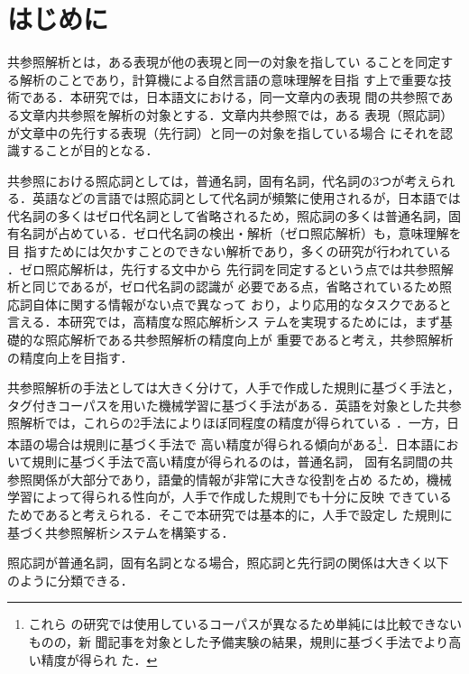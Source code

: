 \documentclass[japanese]{jnlp_1.4}
\begin{document}
\maketitle



 \section{はじめに}
 \label{hajime}
 共参照解析とは，ある表現が他の表現と同一の対象を指してい
 ることを同定する解析のことであり，計算機による自然言語の意味理解を目指
 す上で重要な技術である．本研究では，日本語文における，同一文章内の表現
 間の共参照である文章内共参照を解析の対象とする．文章内共参照では，ある
 表現（照応詞）が文章中の先行する表現（先行詞）と同一の対象を指している場合
 にそれを認識することが目的となる．

 共参照における照応詞としては，普通名詞，固有名詞，代名詞の3つが考えられ
 る．英語などの言語では照応詞として代名詞が頻繁に使用されるが，日本語では
 代名詞の多くはゼロ代名詞として省略されるため，照応詞の多くは普通名詞，固
 有名詞が占めている．ゼロ代名詞の検出・解析（ゼロ照応解析）も，意味理解を目
 指すためには欠かすことのできない解析であり，多くの研究が行われている
 \cite{Seki2002,Kawahara2004a,Iida2006}．ゼロ照応解析は，先行する文中から
 先行詞を同定するという点では共参照解析と同じであるが，ゼロ代名詞の認識が
 必要である点，省略されているため照応詞自体に関する情報がない点で異なって
 おり，より応用的なタスクであると言える．本研究では，高精度な照応解析シス
 テムを実現するためには，まず基礎的な照応解析である共参照解析の精度向上が
 重要であると考え，共参照解析の精度向上を目指す．

 共参照解析の手法としては大きく分けて，人手で作成した規則に基づく手法と，
 タグ付きコーパスを用いた機械学習に基づく手法がある．英語を対象とした共参
 照解析では，これらの2手法によりほぼ同程度の精度が得られている
 \cite{Soon2001,Ng2002a,Zhou2004}．一方，日本語の場合は規則に基づく手法で
 高い精度が得られる傾向がある\cite{Iida2003,Murata1996b}\footnote{これら
 の研究では使用しているコーパスが異なるため単純には比較できないものの，新
 聞記事を対象とした予備実験の結果，規則に基づく手法でより高い精度が得られ
 た．}．日本語において規則に基づく手法で高い精度が得られるのは，普通名詞，
 固有名詞間の共参照関係が大部分であり，語彙的情報が非常に大きな役割を占め
 るため，機械学習によって得られる性向が，人手で作成した規則でも十分に反映
 できているためであると考えられる．そこで本研究では基本的に，人手で設定し
 た規則に基づく共参照解析システムを構築する．

 照応詞が普通名詞，固有名詞となる場合，照応詞と先行詞の関係は大きく以下
 のように分類できる．
\end{document}
